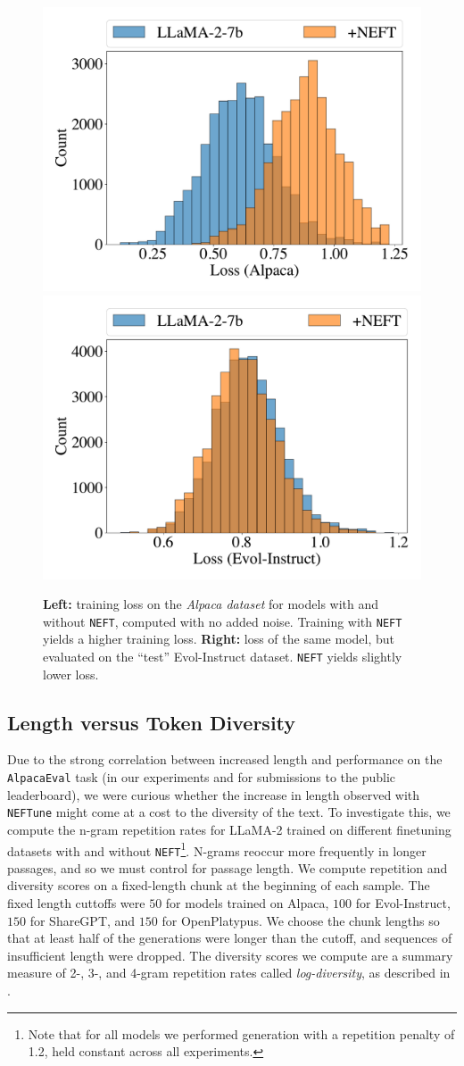 \documentclass{article} %
\newcommand{\neft}{\texttt{NEFT}}
\newcommand{\neftune}{\texttt{NEFTune}}
\newcommand{\llama}{LLaMA}
\begin{document}
\begin{figure}
    \centering
    \includegraphics[width=0.48\linewidth,trim={0cm 0.8cm 0cm 0.8cm},clip]{figures/alpaca-train_cross_entropy_square.pdf}
    \includegraphics[width=0.48\linewidth,trim={0cm 0.8cm 0cm 0.8cm},clip]{figures/wizard-train_cross_entropy_square.pdf}
    \caption{\textbf{Left:} training loss on the \textit{Alpaca dataset} for models with and without \neft{}, computed with no added noise. Training with \neft{} yields a higher training loss.  \textbf{Right:} loss of the same model, but evaluated on the ``test'' Evol-Instruct dataset. \neft{} yields slightly lower loss.}
    \label{fig:trainingloss_testloss}
\end{figure}


\subsection{Length versus Token Diversity} \label{fig:length_vs_token_diversity}

Due to the strong correlation between increased length and performance on the \texttt{AlpacaEval} task (in our experiments and for submissions to the public leaderboard), we were curious whether the increase in length observed with \neftune{} might come at a cost to the diversity of the text. 
To investigate this, we compute the n-gram repetition rates for \llama{}-2 trained on different finetuning datasets with and without \neft{}\footnote{Note that for all models we performed generation with a repetition penalty of 1.2, held constant across all experiments.}. 
N-grams reoccur more frequently in longer passages, and so we must control for passage length.
We compute repetition and diversity scores on a fixed-length chunk at the beginning of each sample.
The fixed length cuttoffs were $50$ for models trained on Alpaca,  $100$ for Evol-Instruct, $150$ for ShareGPT, and $150$ for OpenPlatypus.
We choose the chunk lengths so that at least half of the generations were longer than the cutoff, and sequences of insufficient length were dropped.
The diversity scores we compute are a summary measure of 2-, 3-, and 4-gram repetition rates called \textit{log-diversity}, as described in \citet{kirchenbauer2023reliability, li2022contrastive}. 
\end{document}
